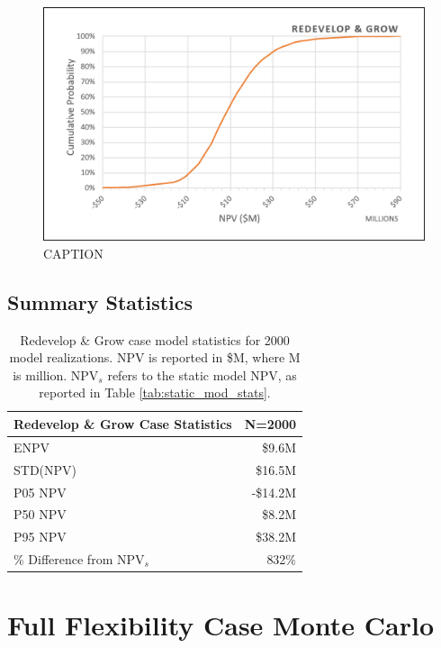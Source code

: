 \begin{figure}[!htp]
\centering
\includegraphics[width=.98\textwidth]{templates/images/Figure-Grow_Case_CDF.png}
\caption[Redevelop \& Grow Case CDF]{CAPTION}
\label{fig:grow_case_cdf}
\end{figure}

\subsection{Summary Statistics}
\label{ch6:grow_stats}

\begin{table}[!htp]
\centering
\begin{tabular}{|l|r|}
\hline
\textbf{Redevelop \& Grow Case Statistics} & N=2000 \\ \hline
ENPV & \$9.6M \\ \hline
STD(NPV) & \$16.5M \\ \hline
P05 NPV & -\$14.2M \\ \hline
P50 NPV & \$8.2M \\ \hline
P95 NPV & \$38.2M \\ \hline
\% Difference from NPV$_{s}$ & 832\% \\ \hline
\end{tabular}
\caption[Redevelop \& Grow Case statistics]{Redevelop \& Grow case model statistics for 2000 model realizations. NPV is reported in \$M, where M is million. NPV$_s$ refers to the static model NPV, as reported in Table \ref{tab:static_mod_stats}.}
\label{tab:grow_stats}
\end{table}


\section{Full Flexibility Case Monte Carlo}

